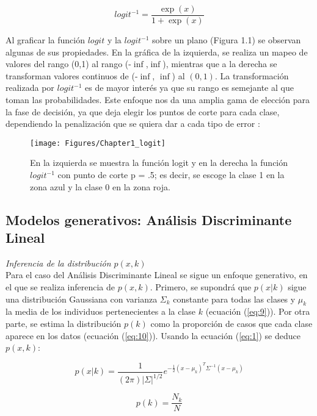 \begin{equation} \label{eq:17}
 logit^{-1}  = \frac{\exp(x)}{1+\exp(x)}
 \end{equation}


Al graficar la función $logit$ y la $logit^{-1}$ sobre un plano (Figura 1.1) se observan algunas de sus propiedades. En la gráfica de la izquierda, se realiza un mapeo de valores del rango (0,1) al rango (-$\inf$,$\inf$), mientras que a la derecha se transforman valores continuos de (-$\inf$, $\inf$) al $(0,1)$. La transformación realizada por $logit^{-1}$ es de mayor interés ya que su rango es semejante al que toman las probabilidades. Este enfoque nos da una amplia gama de elección para la fase de decisión, ya que deja elegir los puntos de corte para cada clase, dependiendo la penalización que se quiera dar a cada tipo de error \cite{hastie2009elements}:

\begin{figure}[!ht]
  \centering
	\texttt{[image: Figures/Chapter1\_logit]}	
  \caption[Función logit y $logit^{-1}$]
  {En la izquierda se muestra la función logit y en la derecha la función $logit^{-1}$ con punto de corte p = .5; es decir, se escoge la clase 1 en la zona azul y la clase 0 en la zona roja.}
\end{figure}

\pagebreak
\subsection{Modelos generativos: Análisis Discriminante Lineal}


\textit{Inferencia de la distribución $p(x,k)$}\\
Para el caso del Análisis Discriminante Lineal se sigue un enfoque generativo, en el que se realiza inferencia de $p(x,k)$. Primero, se supondrá que $p(x|k)$ sigue una distribución Gaussiana con varianza $\Sigma_{k}$ constante para todas las clases y $\mu_{k}$ la media de los individuos pertenecientes a la clase $k$ (ecuación (\ref{eq:9})). Por otra parte, se estima la distribución $p(k)$ como la proporción de casos que cada clase aparece en los datos (ecuación (\ref{eq:10})). Usando la ecuación (\ref{eq:1}) se deduce $p(x,k)$:


\begin{equation} \label{eq:9}
 p(x|k) = \frac{1}{(2\pi) |\Sigma|^{1/2}} e^{-\frac{1}{2}(x-\mu_{k})^{T}\Sigma^{-1}(x-\mu_{k})}
\end{equation}

\begin{equation} \label{eq:10}
 p(k) = \frac{N_k}{N}	
\end{equation}


